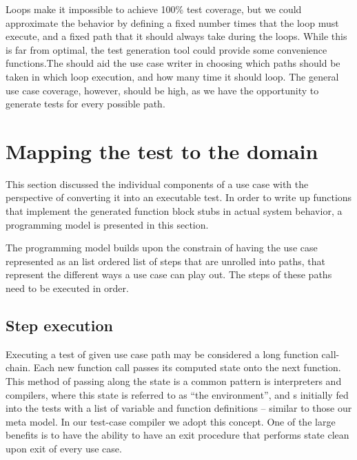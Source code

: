 \noindent Loops make it impossible to achieve 100\% test coverage, but we could approximate the behavior by defining a fixed number times that the loop must execute, and a fixed path that it should always take during the loops. While this is far from optimal, the test generation tool could provide some convenience functions.The should aid the use case writer in choosing which paths should be taken in which loop execution, and how many time it should loop. The general use case coverage, however, should be high, as we have the opportunity to generate tests for every possible path.

\section{Mapping the test to the domain}
This section discussed the individual components of a use case with the perspective of converting it into an executable test. In order to write up functions that implement the generated function block stubs in actual system behavior, a programming model is presented in this section.\medskip

\noindent The programming model builds upon the constrain of having the use case represented as an list ordered list of steps that are unrolled into paths, that represent the different ways a use case can play out. The steps of these paths need to be executed in order.
\subsection{Step execution}
\label{ssec:step-execution}
\label{sec:use-case-environment}
Executing a test of given use case path may be considered a long function call-chain. Each new function call passes its computed state onto the next function. This method of passing along the state is a common pattern is interpreters and compilers, where this state is referred to as ``the environment'', and s initially fed into the tests with a list of variable and function definitions -- similar to those our meta model. In our test-case compiler we adopt this concept. One of the large benefits is to have the ability to have an exit procedure that performs state clean upon exit of every use case.\medskip

